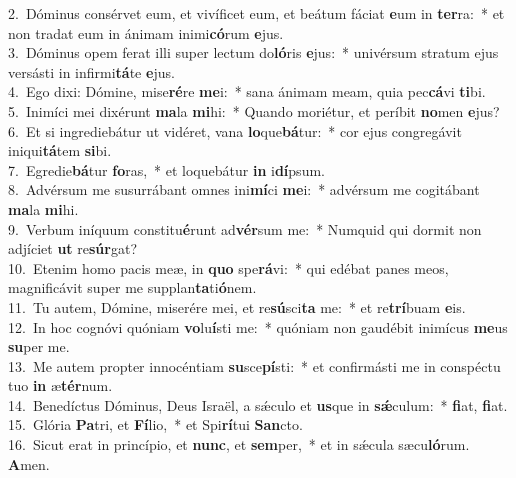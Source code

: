 {2.~}Dóminus consérvet eum, et vivíficet eum, et beátum fáciat \textbf{e}um in \textbf{ter}ra:~* et non tradat eum in ánimam inimi\textbf{có}rum \textbf{e}jus.\\
{3.~}Dóminus opem ferat illi super lectum do\textbf{ló}ris \textbf{e}jus:~* univérsum stratum ejus versásti in infirmi\textbf{tá}te \textbf{e}jus.\\
{4.~}Ego dixi: Dómine, mise\textbf{ré}re \textbf{me}i:~* sana ánimam meam, quia pec\textbf{cá}vi \textbf{ti}bi.\\
{5.~}Inimíci mei dixérunt \textbf{ma}la \textbf{mi}hi:~* Quando moriétur, et períbit \textbf{no}men \textbf{e}jus?\\
{6.~}Et si ingrediebátur ut vidéret, vana \textbf{lo}que\textbf{bá}tur:~* cor ejus congregávit iniqui\textbf{tá}tem \textbf{si}bi.\\
{7.~}Egredie\textbf{bá}tur \textbf{fo}ras,~* et loquebátur \textbf{in} i\textbf{dí}psum.\\
{8.~}Advérsum me susurrábant omnes ini\textbf{mí}ci \textbf{me}i:~* advérsum me cogitábant \textbf{ma}la \textbf{mi}hi.\\
{9.~}Verbum iníquum constitu\textbf{é}runt ad\textbf{vér}sum me:~* Numquid qui dormit non adjíciet \textbf{ut} re\textbf{súr}gat?\\
{10.~}Etenim homo pacis meæ, in \textbf{quo} spe\textbf{rá}vi:~* qui edébat panes meos, magnificávit super me supplan\textbf{ta}ti\textbf{ó}nem.\\
{11.~}Tu autem, Dómine, miserére mei, et re\textbf{sú}sci\textbf{ta} me:~* et re\textbf{trí}buam \textbf{e}is.\\
{12.~}In hoc cognóvi quóniam \textbf{vo}lu\textbf{í}sti me:~* quóniam non gaudébit inimícus \textbf{me}us \textbf{su}per me.\\
{13.~}Me autem propter innocéntiam \textbf{su}sce\textbf{pí}sti:~* et confirmásti me in conspéctu tuo \textbf{in} æ\textbf{tér}num.\\
{14.~}Benedíctus Dóminus, Deus Israël, a sǽculo et \textbf{us}que in \textbf{sǽ}culum:~* \textbf{fi}at, \textbf{fi}at.\\
{15.~}Glória \textbf{Pa}tri, et \textbf{Fí}lio,~* et Spi\textbf{rí}tui \textbf{San}cto.\\
{16.~}Sicut erat in princípio, et \textbf{nunc}, et \textbf{sem}per,~* et in sǽcula sæcu\textbf{ló}rum. \textbf{A}men.\\
